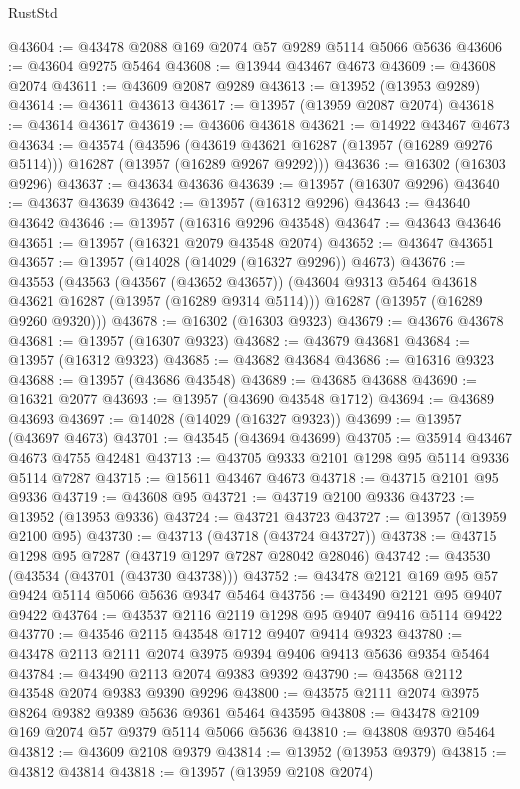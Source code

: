 \begin{lexlean}{RustStd}
\begin{coremodule}
@43604 := @43478 @2088 @169 @2074 @57 @9289 @5114 @5066 @5636
@43606 := @43604 @9275 @5464
@43608 := @13944 @43467 @4673
@43609 := @43608 @2074
@43611 := @43609 @2087 @9289
@43613 := @13952 (@13953 @9289)
@43614 := @43611 @43613
@43617 := @13957 (@13959 @2087 @2074)
@43618 := @43614 @43617
@43619 := @43606 @43618
@43621 := @14922 @43467 @4673
@43634 := @43574
    (@43596
      (@43619 @43621 @16287 (@13957 (@16289 @9276 @5114)))
      @16287
      (@13957 (@16289 @9267 @9292)))
@43636 := @16302 (@16303 @9296)
@43637 := @43634 @43636
@43639 := @13957 (@16307 @9296)
@43640 := @43637 @43639
@43642 := @13957 (@16312 @9296)
@43643 := @43640 @43642
@43646 := @13957 (@16316 @9296 @43548)
@43647 := @43643 @43646
@43651 := @13957 (@16321 @2079 @43548 @2074)
@43652 := @43647 @43651
@43657 := @13957 (@14028 (@14029 (@16327 @9296)) @4673)
@43676 := @43553
    (@43563
      (@43567 (@43652 @43657))
      (@43604 @9313 @5464 @43618 @43621 @16287 (@13957 (@16289 @9314 @5114)))
      @16287
      (@13957 (@16289 @9260 @9320)))
@43678 := @16302 (@16303 @9323)
@43679 := @43676 @43678
@43681 := @13957 (@16307 @9323)
@43682 := @43679 @43681
@43684 := @13957 (@16312 @9323)
@43685 := @43682 @43684
@43686 := @16316 @9323
@43688 := @13957 (@43686 @43548)
@43689 := @43685 @43688
@43690 := @16321 @2077
@43693 := @13957 (@43690 @43548 @1712)
@43694 := @43689 @43693
@43697 := @14028 (@14029 (@16327 @9323))
@43699 := @13957 (@43697 @4673)
@43701 := @43545 (@43694 @43699)
@43705 := @35914 @43467 @4673 @4755 @42481
@43713 := @43705 @9333 @2101 @1298 @95 @5114 @9336 @5114 @7287
@43715 := @15611 @43467 @4673
@43718 := @43715 @2101 @95 @9336
@43719 := @43608 @95
@43721 := @43719 @2100 @9336
@43723 := @13952 (@13953 @9336)
@43724 := @43721 @43723
@43727 := @13957 (@13959 @2100 @95)
@43730 := @43713 (@43718 (@43724 @43727))
@43738 := @43715 @1298 @95 @7287 (@43719 @1297 @7287 @28042 @28046)
@43742 := @43530 (@43534 (@43701 (@43730 @43738)))
@43752 := @43478 @2121 @169 @95 @57 @9424 @5114 @5066 @5636 @9347 @5464
@43756 := @43490 @2121 @95 @9407 @9422
@43764 := @43537 @2116 @2119 @1298 @95 @9407 @9416 @5114 @9422
@43770 := @43546 @2115 @43548 @1712 @9407 @9414 @9323
@43780 := @43478 @2113 @2111 @2074 @3975 @9394 @9406 @9413 @5636 @9354 @5464
@43784 := @43490 @2113 @2074 @9383 @9392
@43790 := @43568 @2112 @43548 @2074 @9383 @9390 @9296
@43800 := @43575 @2111 @2074 @3975 @8264 @9382 @9389 @5636 @9361 @5464 @43595
@43808 := @43478 @2109 @169 @2074 @57 @9379 @5114 @5066 @5636
@43810 := @43808 @9370 @5464
@43812 := @43609 @2108 @9379
@43814 := @13952 (@13953 @9379)
@43815 := @43812 @43814
@43818 := @13957 (@13959 @2108 @2074)

\end{coremodule}
\end{lexlean}
